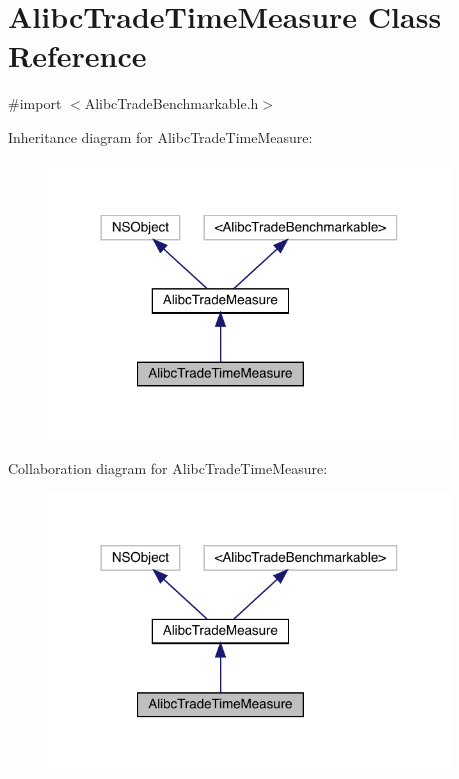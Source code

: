 \hypertarget{interface_alibc_trade_time_measure}{}\section{Alibc\+Trade\+Time\+Measure Class Reference}
\label{interface_alibc_trade_time_measure}


{\ttfamily \#import $<$Alibc\+Trade\+Benchmarkable.\+h$>$}



Inheritance diagram for Alibc\+Trade\+Time\+Measure\+:\nopagebreak
\begin{figure}[H]
\begin{center}
\leavevmode
\includegraphics[width=302pt]{interface_alibc_trade_time_measure__inherit__graph}
\end{center}
\end{figure}


Collaboration diagram for Alibc\+Trade\+Time\+Measure\+:\nopagebreak
\begin{figure}[H]
\begin{center}
\leavevmode
\includegraphics[width=302pt]{interface_alibc_trade_time_measure__coll__graph}
\end{center}
\end{figure}
